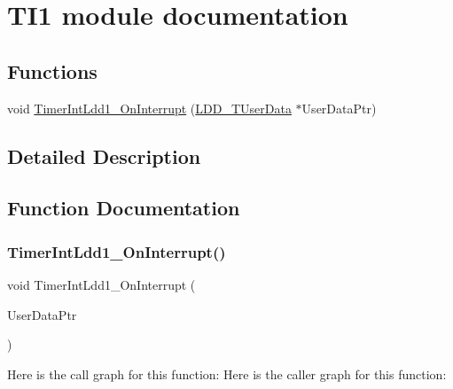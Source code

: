\hypertarget{group___t_i1__module}{}\section{T\+I1 module documentation}
\label{group___t_i1__module}
\subsection*{Functions}
\begin{DoxyCompactItemize}
\item 
void \hyperlink{group___t_i1__module_ga54442f7694fc9c73818c8e5985597415}{Timer\+Int\+Ldd1\+\_\+\+On\+Interrupt} (\hyperlink{group___p_e___types__module_ga0b66a73f87238a782318aa0be7578e35}{L\+D\+D\+\_\+\+T\+User\+Data} $\ast$User\+Data\+Ptr)
\end{DoxyCompactItemize}


\subsection{Detailed Description}


\subsection{Function Documentation}
\mbox{\label{group___t_i1__module_ga54442f7694fc9c73818c8e5985597415}} 
\subsubsection{\texorpdfstring{Timer\+Int\+Ldd1\+\_\+\+On\+Interrupt()}{TimerIntLdd1\_OnInterrupt()}}
{\footnotesize\ttfamily void Timer\+Int\+Ldd1\+\_\+\+On\+Interrupt (\begin{DoxyParamCaption}\item[{\hyperlink{group___p_e___types__module_ga0b66a73f87238a782318aa0be7578e35}{L\+D\+D\+\_\+\+T\+User\+Data} $\ast$}]{User\+Data\+Ptr }\end{DoxyParamCaption})}

Here is the call graph for this function\+:
Here is the caller graph for this function\+:
